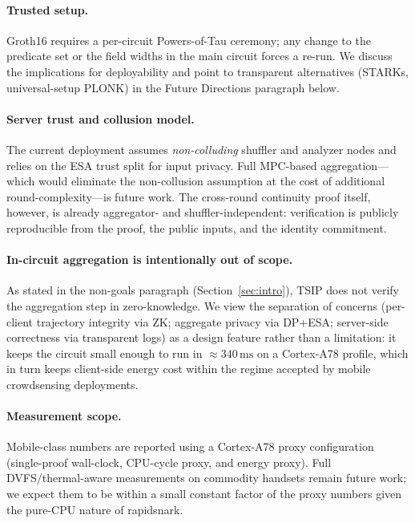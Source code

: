 \documentclass[conference]{IEEEtran}
\theoremstyle{definition}
\theoremstyle{plain}
\begin{document}
\paragraph{Trusted setup.}
Groth16 requires a per-circuit Powers-of-Tau ceremony; any change to the
predicate set or the field widths in the main circuit forces a
re-run. We discuss the implications for deployability and point to
transparent alternatives (STARKs, universal-setup PLONK) in the Future
Directions paragraph below.

\paragraph{Server trust and collusion model.}
The current deployment assumes \emph{non-colluding} shuffler and analyzer
nodes and relies on the ESA trust split for input privacy. Full
MPC-based aggregation---which would eliminate the non-collusion
assumption at the cost of additional round-complexity---is future work.
The cross-round continuity proof itself, however, is already aggregator-
and shuffler-independent: verification is publicly reproducible from
the proof, the public inputs, and the identity commitment.

\paragraph{In-circuit aggregation is intentionally out of scope.}
As stated in the non-goals paragraph (Section~\ref{sec:intro}),
\textsc{TSIP} does not verify the aggregation step in zero-knowledge. We view the separation of concerns
(per-client trajectory integrity via ZK; aggregate privacy via DP+ESA;
server-side correctness via transparent logs) as a design feature rather
than a limitation: it keeps the circuit small enough to run in
$\approx\!340\,\mathrm{ms}$ on a Cortex-A78 profile, which in turn keeps
client-side energy cost within the regime accepted by mobile
crowdsensing deployments.

\paragraph{Measurement scope.}
Mobile-class numbers are reported using a Cortex-A78 proxy
configuration (single-proof wall-clock, CPU-cycle proxy, and energy
proxy). Full DVFS/thermal-aware measurements on commodity handsets
remain future work; we expect them to be within a small
constant factor of the proxy numbers given the pure-CPU nature of
rapidsnark.
\end{document}
